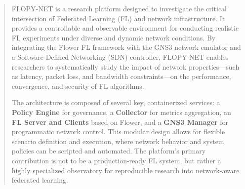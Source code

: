 \documentclass[12pt,twoside,a4paper]{article}
\begin{document}
\begin{abstract}
\noindent FLOPY-NET is a research platform designed to investigate the critical intersection of Federated Learning (FL) and network infrastructure. It provides a controllable and observable environment for conducting realistic FL experiments under diverse and dynamic network conditions. By integrating the Flower FL framework with the GNS3 network emulator and a Software-Defined Networking (SDN) controller, FLOPY-NET enables researchers to systematically study the impact of network properties---such as latency, packet loss, and bandwidth constraints---on the performance, convergence, and security of FL algorithms.

The architecture is composed of several key, containerized services: a \textbf{Policy Engine} for governance, a \textbf{Collector} for metrics aggregation, an \textbf{FL Server and Clients} based on Flower, and a \textbf{GNS3 Manager} for programmatic network control. This modular design allows for flexible scenario definition and execution, where network behavior and system policies can be scripted and automated. The platform's primary contribution is not to be a production-ready FL system, but rather a highly specialized observatory for reproducible research into network-aware federated learning.
\end{abstract}
\newpage
\tableofcontents
\newpage


















\newpage
\appendix
%

%
%
%
\newpage



\end{document}
